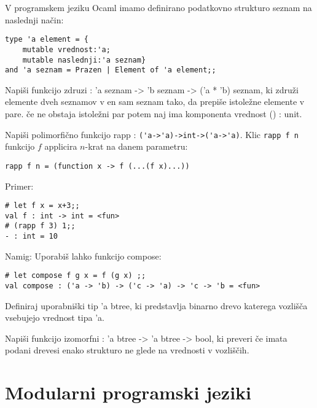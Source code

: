 \begin{ex}
  V programskem jeziku Ocaml imamo definirano podatkovno strukturo
  seznam na naslednji na\v cin:
\begin{lstlisting}
type 'a element = { 
    mutable vrednost:'a; 
    mutable naslednji:'a seznam} 
and 'a seznam = Prazen | Element of 'a element;; 
\end{lstlisting}

  Napi\v si funkcijo zdruzi : 'a seznam -> 'b seznam -> ('a * 'b)
  seznam, ki zdru\v zi elemente dveh seznamov v en sam seznam tako, da
  prepi\v se istole\v zne elemente v pare. \v ce ne obstaja istole\v
  zni par potem naj ima komponenta vrednost () : unit.

 
\end{ex} 
\begin{ex}
  Napi\v si polimorfi\v cno funkcijo rapp :
  \lstinline{('a->'a)->int->('a->'a)}. Klic \lstinline{rapp f n}  funkcijo $f$ applicira $n$-krat
  na danem parametru:
\begin{lstlisting}
rapp f n = (function x -> f (...(f x)...))     
\end{lstlisting}

\noindent\/Primer:            
\begin{lstlisting}
# let f x = x+3;; 
val f : int -> int = <fun> 
# (rapp f 3) 1;; 
- : int = 10 

\end{lstlisting}

Namig: Uporabi\v s lahko funkcijo compose:

\begin{lstlisting}
# let compose f g x = f (g x) ;; 
val compose : ('a -> 'b) -> ('c -> 'a) -> 'c -> 'b = <fun> 
\end{lstlisting}

\end{ex} 
\begin{ex}
  Definiraj uporabni\v ski tip 'a btree, ki predstavlja binarno drevo
  katerega vozli\v s\v ca vsebujejo vrednost tipa 'a.

  Napi\v si funkcijo izomorfni : 'a btree -> 'a btree -> bool, ki
  preveri \v ce imata podani drevesi enako strukturo ne glede na
  vrednosti v vozli\v s\v cih.


\end{ex} 

\chapter{Modularni programski jeziki}

